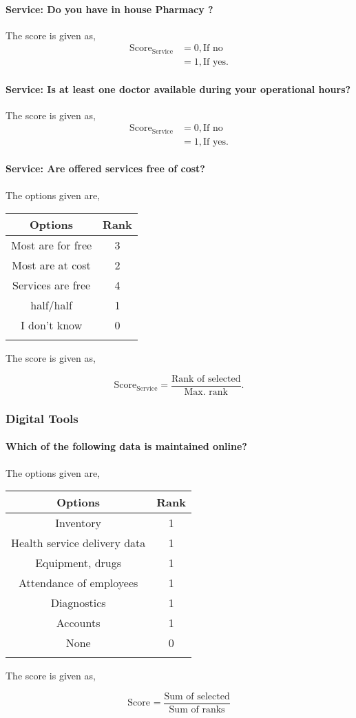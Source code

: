 \documentclass[oneside]{article}
\newcommand{\tsub}[2]{\text{#1}_{\text{#2}}}
\newcommand{\dsub}[2]{\dfrac{\text{#1}}{\text{#2}}}
\newcommand{\multsel}[1]
{
	\[
		\tsub{Score}{#1} = \dsub{Sum of selected}{Sum of ranks}
	\]
}
\newcommand{\singsel}[1]
{
	\[
		\tsub{Score}{#1} = \dsub{Rank of selected}{Max. rank}.
	\]
}
\newenvironment{ttable}
{
\begin{center}
\begin{tabular}{c|c}
\hline
}
{
\\ \hline
\end{tabular}
\end{center}
}
\begin{document}
\paragraph{Service: Do you have in house Pharmacy ?}

The score is given as,
\begin{align*}
\tsub{Score}{Service} &= 0, \text{If no} \\
        &= 1, \text{If yes}.
\end{align*}
\paragraph{Service: Is at least one doctor available during your operational hours?}

The score is given as,
\begin{align*}
\tsub{Score}{Service} &= 0, \text{If no} \\
        &= 1, \text{If yes}.
\end{align*}
\paragraph{Service: Are offered services free of cost?}

The options given are,
\begin{ttable}
Options & Rank \\ \hline
Most are for free & 3 \\
Most are at cost & 2 \\
Services are free & 4 \\
half/half & 1 \\
I don't know & 0 \\
\hline
\end{ttable}
The score is given as,
\singsel{Service}
\subsubsection{Digital Tools}

\paragraph{ Which of the following data is maintained online?}

The options given are,
\begin{ttable}
Options & Rank \\ \hline
Inventory & 1 \\
Health service delivery data & 1 \\
Equipment, drugs & 1 \\
Attendance of employees & 1 \\
Diagnostics & 1 \\
Accounts & 1 \\
None & 0 \\
\hline
\end{ttable}
The score is given as,
\multsel{}
\end{document}
